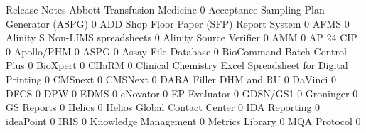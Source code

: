 \documentclass{article}
\begin{document}
\begin{Schunk}
\begin{Soutput}
                                                            Release Notes
  Abbott Transfusion Medicine                                           0
  Acceptance Sampling Plan Generator (ASPG)                             0
  ADD Shop Floor Paper (SFP) Report System                              0
  AFMS                                                                  0
  Alinity S Non-LIMS spreadsheets                                       0
  Alinity Source Verifier                                               0
  AMM                                                                   0
  AP 24 CIP                                                             0
  Apollo/PHM                                                            0
  ASPG                                                                  0
  Assay File Database                                                   0
  BioCommand Batch Control Plus                                         0
  BioXpert                                                              0
  CHaRM                                                                 0
  Clinical Chemistry Excel Spreadsheet for Digital Printing             0
  CMSnext                                                               0
  CMSNext                                                               0
  DARA Filler DHM and RU                                                0
  DaVinci                                                               0
  DFCS                                                                  0
  DPW                                                                   0
  EDMS                                                                  0
  eNovator                                                              0
  EP Evaluator                                                          0
  GDSN/GS1                                                              0
  Groninger                                                             0
  GS Reports                                                            0
  Helios                                                                0
  Helios Global Contact Center                                          0
  IDA Reporting                                                         0
  ideaPoint                                                             0
  IRIS                                                                  0
  Knowledge Management                                                  0
  Metrics Library                                                       0
  MQA Protocol                                                          0

\end{Soutput}
\end{Schunk}
\end{document}
